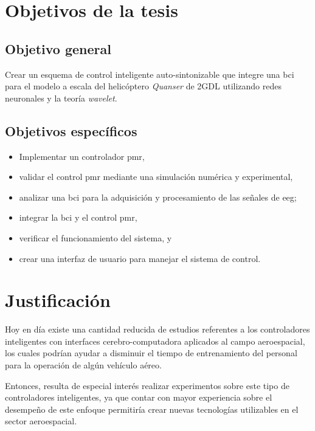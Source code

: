 
\section{Objetivos de la tesis}

    \subsection*{Objetivo general}
 
        Crear un esquema de control inteligente auto-sintonizable que integre una \acrlong{bci} para el modelo a escala del helicóptero \textit{Quanser} de 2GDL utilizando redes neuronales y la teoría \textit{wavelet}.
        
    \subsection*{Objetivos específicos}
    
        \begin{itemize}[noitemsep, nolistsep]
            \item Implementar un controlador \acrlong{pmr},
            \item validar el control \acrshort{pmr} mediante una simulación numérica y experimental,
            \item analizar una \acrlong{bci} para la adquisición y procesamiento de las señales de \acrlong{eeg};
            \item integrar la \acrlong{bci} y el control \acrlong{pmr},
            \item verificar el funcionamiento del sistema, y
            \item crear una interfaz de usuario para manejar el sistema de control.
        \end{itemize}

\section{Justificación}

    Hoy en día existe una cantidad reducida de estudios referentes a los controladores inteligentes con interfaces cerebro-computadora aplicados al campo aeroespacial, los cuales podrían ayudar a disminuir el tiempo de entrenamiento del personal para la operación de algún vehículo aéreo.
    
    Entonces, resulta de especial interés realizar experimentos sobre este tipo de controladores inteligentes, ya que contar con mayor experiencia sobre el desempeño de este enfoque permitiría crear nuevas tecnologías utilizables en el sector aeroespacial.
    
